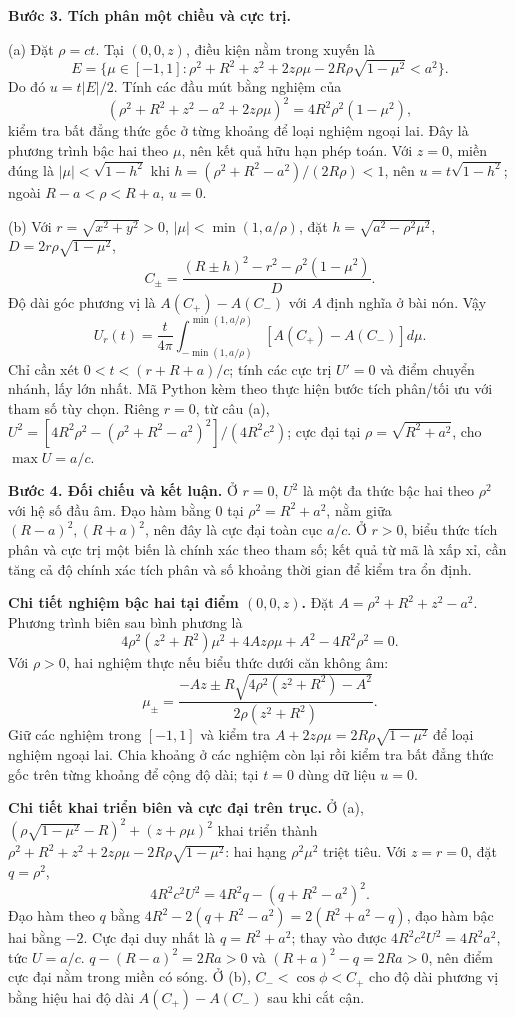 \textbf{Bước 3. Tích phân một chiều và cực trị.}

(a) Đặt $\rho=ct$. Tại $(0,0,z)$, điều kiện nằm trong xuyến là
\[E=\{\mu\in[-1,1]:\rho^2+R^2+z^2+2z\rho\mu-2R\rho\sqrt{1-\mu^2}<a^2\}.\]
Do đó $u=t|E|/2$. Tính các đầu mút bằng nghiệm của
\[(\rho^2+R^2+z^2-a^2+2z\rho\mu)^2=4R^2\rho^2(1-\mu^2),\]
kiểm tra bất đẳng thức gốc ở từng khoảng để loại nghiệm ngoại lai. Đây là phương trình bậc hai theo $\mu$, nên kết quả hữu hạn phép toán. Với $z=0$, miền đúng là $|\mu|<\sqrt{1-h^2}$ khi $h=(\rho^2+R^2-a^2)/(2R\rho)<1$, nên $u=t\sqrt{1-h^2}$; ngoài $R-a<\rho<R+a$, $u=0$.

(b) Với $r=\sqrt{x^2+y^2}>0$, $|\mu|<\min(1,a/\rho)$, đặt $h=\sqrt{a^2-\rho^2\mu^2}$, $D=2r\rho\sqrt{1-\mu^2}$,
\[C_\pm=\frac{(R\pm h)^2-r^2-\rho^2(1-\mu^2)}D.\]
Độ dài góc phương vị là $A(C_+)-A(C_-)$ với $A$ định nghĩa ở bài nón. Vậy
\[U_r(t)=\frac t{4\pi}\int_{-\min(1,a/\rho)}^{\min(1,a/\rho)}[A(C_+)-A(C_-)]d\mu.\]
Chỉ cần xét $0<t<(r+R+a)/c$; tính các cực trị $U'=0$ và điểm chuyển nhánh, lấy lớn nhất. Mã Python kèm theo thực hiện bước tích phân/tối ưu với tham số tùy chọn. Riêng $r=0$, từ câu (a), $U^2=[4R^2\rho^2-(\rho^2+R^2-a^2)^2]/(4R^2c^2)$; cực đại tại $\rho=\sqrt{R^2+a^2}$, cho $\max U=a/c$.

\textbf{Bước 4. Đối chiếu và kết luận.} Ở $r=0$, $U^2$ là một đa thức bậc hai theo $\rho^2$ với hệ số đầu âm. Đạo hàm bằng $0$ tại $\rho^2=R^2+a^2$, nằm giữa $(R-a)^2,(R+a)^2$, nên đây là cực đại toàn cục $a/c$. Ở $r>0$, biểu thức tích phân và cực trị một biến là chính xác theo tham số; kết quả từ mã là xấp xỉ, cần tăng cả độ chính xác tích phân và số khoảng thời gian để kiểm tra ổn định.

\textbf{Chi tiết nghiệm bậc hai tại điểm $(0,0,z)$.} Đặt $A=\rho^2+R^2+z^2-a^2$. Phương trình biên sau bình phương là
\[4\rho^2(z^2+R^2)\mu^2+4Az\rho\mu+A^2-4R^2\rho^2=0.\]
Với $\rho>0$, hai nghiệm thực nếu biểu thức dưới căn không âm:
\[\mu_\pm=\frac{-Az\pm R\sqrt{4\rho^2(z^2+R^2)-A^2}}{2\rho(z^2+R^2)}.\]
Giữ các nghiệm trong $[-1,1]$ và kiểm tra $A+2z\rho\mu=2R\rho\sqrt{1-\mu^2}$ để loại nghiệm ngoại lai. Chia khoảng ở các nghiệm còn lại rồi kiểm tra bất đẳng thức gốc trên từng khoảng để cộng độ dài; tại $t=0$ dùng dữ liệu $u=0$.

\textbf{Chi tiết khai triển biên và cực đại trên trục.} Ở (a), $(\rho\sqrt{1-\mu^2}-R)^2+(z+\rho\mu)^2$ khai triển thành $\rho^2+R^2+z^2+2z\rho\mu-2R\rho\sqrt{1-\mu^2}$: hai hạng $\rho^2\mu^2$ triệt tiêu. Với $z=r=0$, đặt $q=\rho^2$,
\[4R^2c^2U^2=4R^2q-(q+R^2-a^2)^2.\]
Đạo hàm theo $q$ bằng $4R^2-2(q+R^2-a^2)=2(R^2+a^2-q)$, đạo hàm bậc hai bằng $-2$. Cực đại duy nhất là $q=R^2+a^2$; thay vào được $4R^2c^2U^2=4R^2a^2$, tức $U=a/c$. $q-(R-a)^2=2Ra>0$ và $(R+a)^2-q=2Ra>0$, nên điểm cực đại nằm trong miền có sóng. Ở (b), $C_-<\cos\phi<C_+$ cho độ dài phương vị bằng hiệu hai độ dài $A(C_+)-A(C_-)$ sau khi cắt cận.

